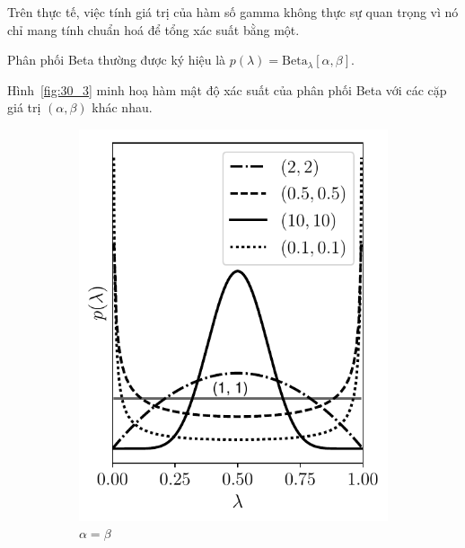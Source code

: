 {Trên thực tế, việc tính giá trị của hàm số gamma không thực sự
quan trọng vì nó chỉ mang tính chuẩn hoá để tổng xác suất bằng một.}

Phân phối Beta thường được ký hiệu là $p(\lambda) =  \text{Beta}_{\lambda}[\alpha, \beta]$.

Hình~\ref{fig:30_3} minh hoạ hàm mật độ xác suất của phân phối Beta với các
cặp giá trị $(\alpha, \beta)$ khác nhau.

\begin{figure}[t]
\begin{subfigure}{0.325\textwidth}
\includegraphics[width=0.99\linewidth]{Chapters/02_LinearAlgebra/30_prob/python/beta1.pdf}
\caption{$\alpha = \beta$}
\label{fig:30_3a}
\end{subfigure}
\begin{subfigure}{0.325\textwidth}

\end{subfigure}
\end{figure}

